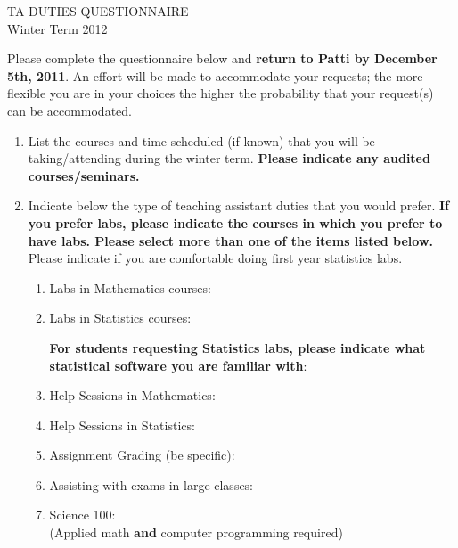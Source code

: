 \documentclass[11pt]{report}
\begin{document}
\begin{center}
{\Large TA DUTIES QUESTIONNAIRE}
\\
Winter Term 2012
\end{center}
Please complete the questionnaire below and {\bf return to Patti by
  December 5th, 2011}.  An effort will be made to accommodate your
requests; the more flexible you are in your choices the higher the
probability that your request(s) can be accommodated.

\begin{enumerate}
\item
  List the courses and time scheduled (if known) that you will be
  taking/attending during the winter term.  {\bf Please indicate any
  audited courses/seminars.}
  \TextField[maxlen=600,name=courseandseminar,
    width=\linewidth,align=0,multiline=true]{\\}

\item
  Indicate below the type of teaching assistant duties that you would
  prefer.  \textbf{If you prefer labs, please indicate the courses in which
  you prefer to have labs.  Please select more than one of the items
  listed below.}  Please indicate if you are comfortable doing first
  year statistics labs.
  \begin{enumerate}
  \item Labs in Mathematics courses:\hfill\TextField[width=\stringwidth,maxlen=30,name=mathlabs,align=0]{}
  \item Labs in Statistics courses:\hfill\TextField[width=\stringwidth,maxlen=30,name=statlabs,align=0]{}

  {\bf For students requesting Statistics labs, please indicate what
    statistical software you are familiar with}:\hfill
  \TextField[maxlen=30,width=\stringwidth,name=statsoft,align=0]{}
  
  \item Help Sessions in Mathematics:\hfill\TextField[width=\stringwidth,maxlen=30,name=mathhelp,align=0]{}
  \item Help Sessions in Statistics:\hfill\TextField[width=\stringwidth,maxlen=30,name=stathelp,align=0]{}
  \item Assignment Grading (be specific):\hfill\TextField[width=\stringwidth,maxlen=30,name=hwgrading,align=0]{}
  \item Assisting with exams in large classes:\hfill\TextField[width=\stringwidth,maxlen=30,name=examgrading,align=0]{}
  \item Science 100:\hfill\TextField[width=\stringwidth,maxlen=30,name=sci100,align=0]{}
    \\ (Applied math \textbf{and} computer programming required)
  \end{enumerate}


\end{enumerate}
\end{document}
